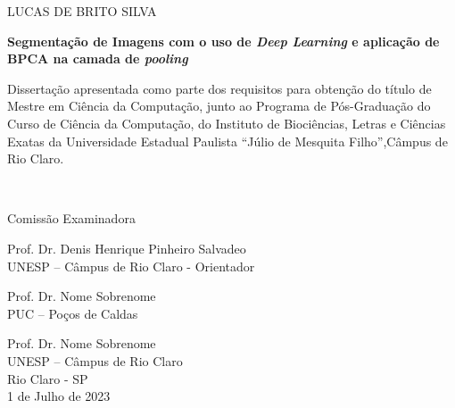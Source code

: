 \newpage
\thispagestyle{empty}

\begin{center}
    {LUCAS DE BRITO SILVA\\}
    
    \vspace{2cm}
    
    \textbf{Segmentação de Imagens com o uso de \textit{Deep Learning} e aplicação de BPCA na camada de \textit{pooling}}
    
    \vspace{4cm}
    
    \hspace{.45\linewidth}
    \begin{minipage}{.50\linewidth}
    \small
        Dissertação apresentada como parte dos requisitos para obtenção do título de Mestre em Ciência da Computação, junto ao Programa de Pós-Graduação do Curso de Ciência da Computação, do Instituto de Biociências, Letras e Ciências Exatas da Universidade Estadual Paulista “Júlio de Mesquita Filho”,Câmpus de Rio Claro.
    \end{minipage} \\
    \normalsize
    
    \vspace{1cm}
    
    Comissão Examinadora\\
    
    \vspace{1cm}

    Prof. Dr. Denis Henrique Pinheiro Salvadeo\\
    UNESP – Câmpus de Rio Claro - Orientador\\
    \vspace{0.5cm}


    Prof. Dr. Nome Sobrenome\\
    PUC – Poços de Caldas\\
    \vspace{0.5cm}


    Prof. Dr. Nome Sobrenome\\
    UNESP – Câmpus de Rio Claro \\

    
    \vspace{2cm}
    Rio Claro - SP \\
    1 de Julho de 2023
\end{center}